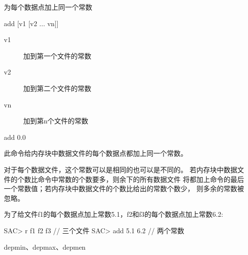 \label{cmd:add}

为每个数据点加上同一个常数

\begin{SACSTX}
add [v1 [v2 ... vn]]
\end{SACSTX}

\begin{description}
\item [v1]  加到第一个文件的常数
\item [v2]  加到第二个文件的常数
\item [vn]  加到第n个文件的常数
\end{description}

\begin{SACDFT}
add 0.0
\end{SACDFT}

此命令给内存块中数据文件的每个数据点都加上同一个常数。

对于每个数据文件，这个常数可以是相同的也可以是不同的。
若内存块中数据文件的个数比命令中常数的个数要多，则余下的所有数据文件
将都加上命令的最后一个常数值；若内存块中数据文件的个数比给出的常数个数少，
则多余的常数被忽略。

为了给文件f1的每个数据点加上常数5.1，f2和f3的每个数据点加上常数6.2:
\begin{SACCode}
SAC> r f1 f2 f3         // 三个文件
SAC> add 5.1 6.2        // 两个常数
\end{SACCode}

depmin、depmax、depmen
